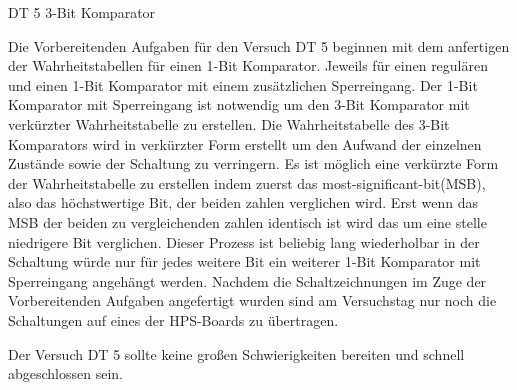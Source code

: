 	
	DT 5 3-Bit Komparator
	
	Die Vorbereitenden Aufgaben für den Versuch DT 5 beginnen mit dem anfertigen der 
	Wahrheitstabellen für einen 1-Bit Komparator. Jeweils für einen regulären und einen 
	1-Bit Komparator mit einem zusätzlichen Sperreingang.
	Der 1-Bit Komparator mit Sperreingang ist notwendig um den 3-Bit Komparator mit 
	verkürzter Wahrheitstabelle zu erstellen. 
	Die Wahrheitstabelle des 3-Bit Komparators wird in verkürzter Form erstellt um den 
	Aufwand der einzelnen Zustände sowie der Schaltung zu verringern.
	Es ist möglich eine verkürzte Form der Wahrheitstabelle zu erstellen indem zuerst 
	das most-significant-bit(MSB), also das höchstwertige Bit, der beiden zahlen verglichen 
	wird. Erst wenn das MSB der beiden zu vergleichenden zahlen identisch ist wird das um 
	eine stelle niedrigere Bit verglichen. Dieser Prozess ist beliebig lang wiederholbar 
	in der Schaltung würde nur für jedes weitere Bit ein weiterer 1-Bit Komparator mit 
	Sperreingang angehängt werden.
	Nachdem die Schaltzeichnungen im Zuge der Vorbereitenden Aufgaben angefertigt wurden 
	sind am Versuchstag nur noch die Schaltungen auf eines der HPS-Boards zu übertragen.
	
	Der Versuch DT 5 sollte keine großen Schwierigkeiten bereiten und schnell 
	abgeschlossen sein.
	